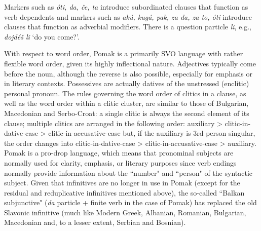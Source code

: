 \documentclass[output=paper,colorlinks,citecolor=brown]{langscibook}
\begin{document}
Markers such as \textit{óti, da, če, ta} introduce subordinated clauses that function as verb dependents and markers such as \textit{akú, kugá, pak, za da, za to, óti} introduce clauses that function as adverbial modifiers.  There is a question particle \textit{li}, e.g., \textit{dojdéš li} `do you come?'.

With respect to word order, Pomak is a primarily SVO language with rather flexible word order, given its highly inflectional nature. Adjectives typically come before the noun, although the reverse is also possible, especially for emphasis or in literary contexts. Possessives are actually datives of the unstressed (enclitic) personal pronoun. The rules governing the word order of clitics in a clause, as well as the word order within a clitic cluster, are similar to those of Bulgarian, Macedonian and Serbo-Croat:  a single clitic is always the second element of its clause; multiple clitics are arranged in the following order: auxiliary > clitic-in-dative-case > clitic-in-accusative-case but, if the auxiliary is 3rd person singular, the order changes into clitic-in-dative-case > clitic-in-accusative-case > auxiliary. Pomak is a pro-drop language, which means that pronominal subjects are normally used for clarity, emphasis, or literary purposes since verb endings normally provide information about the ``number" and ``person" of the syntactic subject. Given that infinitives are no longer in use in Pomak (except for the residual and reduplicative infinitives mentioned above), the so-called ``Balkan subjunctive" (\textit{da} particle + finite verb in the case of Pomak) has replaced the old Slavonic infinitive (much like Modern Greek, Albanian, Romanian, Bulgarian, Macedonian and, to a lesser extent, Serbian and Bosnian).



 
\end{document}
